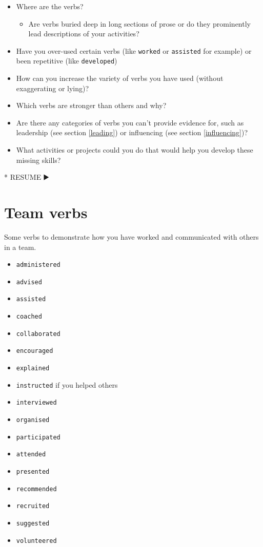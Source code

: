 \documentclass[
]{book}
\newenvironment{Shaded}{\begin{snugshade}}{\end{snugshade}}
\newcommand{\NormalTok}[1]{#1}
\newcommand{\SpecialStringTok}[1]{\textcolor[rgb]{0.31,0.60,0.02}{#1}}
\providecommand{\tightlist}{%
  \setlength{\itemsep}{0pt}\setlength{\parskip}{0pt}}
\begin{document}
\begin{itemize}
\tightlist
\item
  Where are the verbs?

  \begin{itemize}
  \tightlist
  \item
    Are verbs buried deep in long sections of prose or do they prominently lead descriptions of your activities?
  \end{itemize}
\item
  Have you over-used certain verbs (like \texttt{worked} or \texttt{assisted} for example) or been repetitive (like \texttt{developed})
\item
  How can you increase the variety of verbs you have used (without exaggerating or lying)?
\item
  Which verbs are stronger than others and why?
\item
  Are there any categories of verbs you can't provide evidence for, such as leadership (see section \ref{leading}) or influencing (see section \ref{influencing})?
\item
  What activities or projects could you do that would help you develop these missing skills?
\end{itemize}

\begin{Shaded}
\begin{Highlighting}[]
\SpecialStringTok{* }\NormalTok{RESUME ▶️}
\end{Highlighting}
\end{Shaded}

\hypertarget{joining}{%
\section{Team verbs}\label{joining}}

Some verbs to demonstrate how you have worked and communicated with others in a team.

\begin{itemize}
\tightlist
\item
  \texttt{administered}
\item
  \texttt{advised}
\item
  \texttt{assisted}
\item
  \texttt{coached}
\item
  \texttt{collaborated}
\item
  \texttt{encouraged}
\item
  \texttt{explained}
\item
  \texttt{instructed} if you helped others
\item
  \texttt{interviewed}
\item
  \texttt{organised}
\item
  \texttt{participated}
\item
  \texttt{attended}
\item
  \texttt{presented}
\item
  \texttt{recommended}
\item
  \texttt{recruited}
\item
  \texttt{suggested}
\item
  \texttt{volunteered}
\end{itemize}
\end{document}
